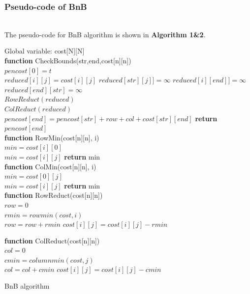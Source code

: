 \subsubsection{Pseudo-code of BnB}
\hfill\\
The pseudo-code for BnB algorithm is shown in \textbf{Algorithm 1\&2}.
\begin{algorithm}
 Global variable: cost[N][N] \\
 \textbf{function} CheckBounds(str,end,cost[n][n]) \\
 $pencost[0]=t$\\
 {
 {$reduced[i][j]=cost[i][j]$}
 }
 {
 $reduced[str][j]]=\infty$
 }
 {
 $reduced[i][end]]=\infty$
 }
 $reduced[end][str]=\infty$\\
 $RowReduct(reduced)$\\
 $ColReduct(reduced)$
 $pencost[end] = pencost[str] + row +col+cost[str][end]$
\textbf{return} $pencost[end]$\\

 \textbf{function} RowMin(cost[n][n], i)\\
 $min=cost[i][0]$\\
 {
 {$min = cost[i][j]$}
 }
 \textbf{return} min\\
 
 \textbf{function} ColMin(cost[n][n], i)\\
 $min=cost[0][j]$\\
 {
 {$min = cost[i][j]$}
 }
 \textbf{return} min\\
 
 \textbf{function} RowReduct(cost[n][n])\\
 $row=0$\\
 {
 $rmin=rowmin(cost,i)$\\
   {$row = row + rmin$}
  {
  {$cost[i][j]=cost[i][j]-rmin$}
  }
 }
 
 \textbf{function} ColReduct(cost[n][n])\\
 $col=0$\\
 {
 $cmin=columnmin(cost,j)$\\
   {$col = col + cmin$}
  {
  {$cost[i][j]=cost[i][j]-cmin$}
  }
 }

 
 
\caption{BnB algorithm}
\end{algorithm}

